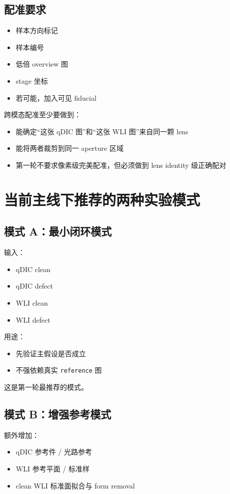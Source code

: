 \documentclass[UTF8,a4paper,11pt]{ctexart}
\newcommand{\Code}[1]{\texttt{#1}}
\begin{document}
\subsection{配准要求}
\begin{itemize}
  \item 样本方向标记
  \item 样本编号
  \item 低倍 overview 图
  \item stage 坐标
  \item 若可能，加入可见 fiducial
\end{itemize}

跨模态配准至少要做到：
\begin{itemize}
  \item 能确定“这张 qDIC 图”和“这张 WLI 图”来自同一颗 lens
  \item 能将两者裁剪到同一 aperture 区域
  \item 第一轮不要求像素级完美配准，但必须做到 lens identity 级正确配对
\end{itemize}

\section{当前主线下推荐的两种实验模式}

\subsection{模式 A：最小闭环模式}

输入：
\begin{itemize}
  \item qDIC clean
  \item qDIC defect
  \item WLI clean
  \item WLI defect
\end{itemize}

用途：
\begin{itemize}
  \item 先验证主假设是否成立
  \item 不强依赖真实 \Code{reference} 图
\end{itemize}

这是第一轮最推荐的模式。

\subsection{模式 B：增强参考模式}

额外增加：
\begin{itemize}
  \item qDIC 参考件 / 光路参考
  \item WLI 参考平面 / 标准样
  \item clean WLI 标准面拟合与 form removal
\end{itemize}
\end{document}
